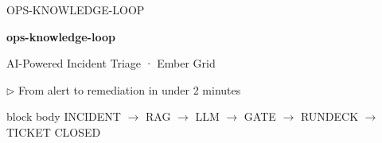 \documentclass[aspectratio=169,10pt]{beamer}
\newcommand{\slidecat}[1]{{\color{cdim}\ttfamily\scriptsize\MakeUppercase{#1}}}
\begin{document}
{
\begin{frame}[plain]
  \vspace{1.2cm}
  \slidecat{ops-knowledge-loop}
  \vspace{0.3cm}

  {\color{cgreen}\ttfamily\Huge\bfseries ops-knowledge-loop}

  \vspace{0.3cm}
  {\color{cteal}\large AI-Powered Incident Triage · Ember Grid}

  \vspace{0.2cm}
  {\color{cdim}\ttfamily\small $\triangleright$ From alert to remediation in under 2 minutes}

  \vspace{0.8cm}
  \begin{beamercolorbox}[sep=6pt,rounded=true]{block body}
    {\color{cgreenD}\ttfamily\footnotesize
    INCIDENT $\rightarrow$ RAG $\rightarrow$ LLM $\rightarrow$ GATE $\rightarrow$ RUNDECK $\rightarrow$ TICKET CLOSED}
  \end{beamercolorbox}
\end{frame}
}

\newcommand{\priorbox}[2]{%
  \begin{beamercolorbox}[wd=\linewidth,sep=0pt,rounded=false,shadow=false]{block body}%
    {\color{#1}\ttfamily\tiny\bfseries #2}\\[-0.1em]
    \rule{\linewidth}{0.4pt}\\[0.15em]
}
\newcommand{\priorboxend}{\end{beamercolorbox}}
\newcommand{\priortagline}[1]{%
  \par\vspace{0.04cm}%
  {\color{cdim}\fontsize{5}{5.5}\selectfont\itshape%
   \linespread{0.75}\selectfont%
   \parbox[t]{\linewidth}{\raggedright\arraybackslash\setlength{\parskip}{0pt}#1}}%
}
\end{document}

